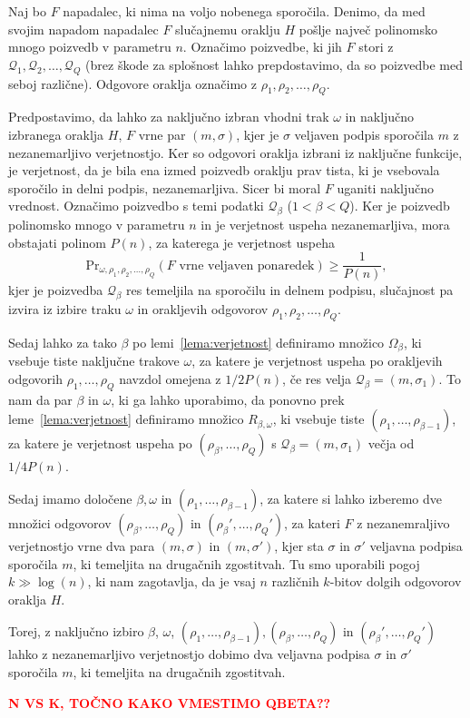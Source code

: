 \documentclass[isrm2, tisk]{fmfdelo}
\newcommand{\todo}[1]{\textcolor{red}{\textbf{\uppercase{#1}??}}}
\begin{document}
\begin{dokaz}
    Naj bo $F$ napadalec, ki nima na voljo nobenega sporočila. Denimo, da med svojim napadom napadalec 
    $F$ slučajnemu oraklju $H$ pošlje največ polinomsko mnogo poizvedb v parametru $n$. Označimo 
    poizvedbe, ki jih $F$ stori z $\mathcal{Q}_1, \mathcal{Q}_2, \dots, \mathcal{Q}_Q$ (brez škode 
    za splošnost lahko prepdostavimo, da so poizvedbe med seboj različne). Odgovore oraklja označimo 
    z $\rho_1, \rho_2 , \dots, \rho_Q$. 

    Predpostavimo, da lahko za naključno izbran vhodni trak $\omega$ in naključno izbranega oraklja $H$,
    $F$ vrne par $(m, \sigma)$, kjer je $\sigma$ veljaven podpis sporočila $m$ z nezanemarljivo
    verjetnostjo. Ker so odgovori oraklja izbrani iz naključne funkcije, je verjetnost, da je bila
    ena izmed poizvedb oraklju prav tista, ki je vsebovala sporočilo in delni podpis, nezanemarljiva.
    Sicer bi moral $F$ uganiti naključno vrednost. Označimo poizvedbo s temi podatki $\mathcal{Q}_\beta$
    ($1 < \beta < Q$). Ker je poizvedb polinomsko mnogo v parametru $n$ in je verjetnost uspeha 
    nezanemarljiva, mora obstajati polinom $P(n)$, za katerega je verjetnost uspeha
    $$
    \text{Pr}_{\omega, \rho_1, \rho_2 , \dots, \rho_Q}(\text{$F$ vrne veljaven ponaredek}) \geq \frac{1}{P(n)},
    $$
    kjer je poizvedba $\mathcal{Q}_\beta$ res temeljila na sporočilu in delnem podpisu, slučajnost
    pa izvira iz izbire traku $\omega$ in orakljevih odgovorov $\rho_1, \rho_2, \dots, \rho_Q$.

    Sedaj lahko za tako $\beta$ po lemi~\ref{lema:verjetnost} definiramo množico $\Omega_\beta$, ki
    vsebuje tiste naključne trakove $\omega$, za katere je verjetnost uspeha po orakljevih odgovorih
    $\rho_1, \dots, \rho_Q$ navzdol omejena z $1/2P(n)$, če res velja $\mathcal{Q}_\beta = (m, \sigma_1)$. 
    To nam da par $\beta$ in $\omega$, ki ga lahko uporabimo, da ponovno prek leme~\ref{lema:verjetnost} 
    definiramo množico $R_{\beta, \omega}$, ki vsebuje tiste $(\rho_1, \dots, \rho_{\beta - 1})$, 
    za katere je verjetnost uspeha po $(\rho_\beta, \dots, \rho_Q)$ s $\mathcal{Q}_\beta = (m, \sigma_1)$ 
    večja od $1/4P(n)$.

    Sedaj imamo določene $\beta, \omega$ in $(\rho_1, \dots, \rho_{\beta - 1})$, za katere si lahko
    izberemo dve množici odgovorov $(\rho_\beta, \dots, \rho_Q)$ in $(\rho_\beta', \dots, \rho_Q')$,
    za kateri $F$ z nezanemraljivo verjetnostjo vrne dva para $(m, \sigma)$ in $(m, \sigma')$, kjer
    sta $\sigma$ in $\sigma'$ veljavna podpisa sporočila $m$, ki temeljita na drugačnih zgostitvah.
    Tu smo uporabili pogoj $k \gg \log(n)$, ki nam zagotavlja, da je vsaj $n$ različnih $k$-bitov
    dolgih odgovorov oraklja $H$.

    Torej, z naključno izbiro $\beta$, $\omega$, $(\rho_1, \dots, \rho_{\beta - 1}), (\rho_\beta, 
    \dots, \rho_Q)$ in $(\rho_\beta', \dots, \rho_Q')$ lahko z nezanemarljivo verjetnostjo dobimo
    dva veljavna podpisa $\sigma$ in $\sigma'$ sporočila $m$, ki temeljita na drugačnih zgostitvah.

    \todo{n vs k, točno kako vmestimo Qbeta}
\end{dokaz}
\end{document}
